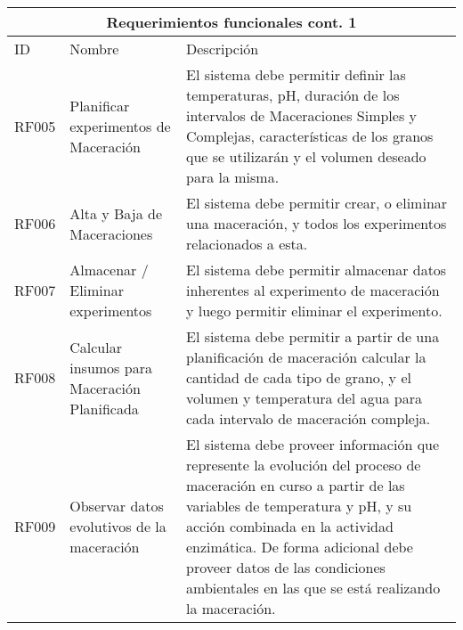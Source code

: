     \begin{minipage}{0.95\textwidth}
    \begin{center}
    \begin{tabularx}{\textwidth}{| X | X | X |}
    \hline
    \multicolumn{3}{|c|}{\textbf{Requerimientos funcionales cont. 1}} \\
    \hline
    ID & Nombre & Descripción \\
    \hline
    \hline
        RF005 &  Planificar experimentos de Maceración & El sistema debe permitir definir las temperaturas, pH, duración de los intervalos de Maceraciones Simples y Complejas, características de los granos que se utilizarán y el volumen deseado para la misma.
        \\\hline
        RF006 & Alta y Baja de Maceraciones & El sistema debe permitir crear, o eliminar una maceración, y todos los experimentos relacionados a esta.  \\\hline
        RF007 & Almacenar / Eliminar experimentos  & El sistema debe permitir almacenar datos inherentes al experimento de maceración y luego permitir eliminar el experimento.
        \\\hline
        RF008 & Calcular insumos para Maceración Planificada & El sistema debe permitir a partir de una planificación de maceración calcular la cantidad de cada tipo de grano, y el volumen y temperatura del agua para cada intervalo de maceración compleja.
        \\\hline
        RF009 & Observar datos evolutivos de la maceración & El sistema debe proveer información que represente la evolución del proceso de maceración en curso a partir de las variables de temperatura y pH, y su acción combinada en la actividad enzimática. De forma adicional debe proveer datos de las condiciones ambientales en las que se está realizando la maceración.
        \\\hline
    \end{tabularx}
    \label{ReqFuncionales_Parte2}
    \end{center}
    \end{minipage}
    
